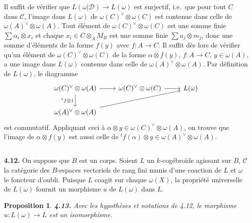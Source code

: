 \documentclass[12pt,a4paper]{article}
\theoremstyle{plain}
\newtheorem{proposition}[theorem]{Proposition}
\theoremstyle{definition}
\theoremstyle{remark}
\begin{document}
Il suffit de vérifier que $L(\omega|\mathcal{D}) \to L(\omega)$ est surjectif, i.e.~que pour tout $C$ dans $\mathcal{C}$, l'image dans $L(\omega)$ de $\omega(C)^\vee \otimes \omega(C)$ est contenue dans celle de $\omega(A)^\vee \otimes \omega(A)$. Tout élément de $\omega(C)^\vee \otimes \omega(C)$ est une somme finie $\sum \alpha_i \otimes x_i$ et chaque $x_i \in C \otimes_A M_B$ est une somme finie $\sum a_j \otimes m_j$, donc une somme d'éléments de la forme $f(y)$ avec $f : A \to C$. Il suffit dès lors de vérifier qu'un élément de $\omega(C)^\vee \otimes \omega(C)$ de la forme $\alpha \otimes f(y)$, $f : A \to C$, $y \in \omega(A)$, a une image dans $L(\omega)$ contenue dans celle de $\omega(A)^\vee \otimes \omega(A)$. Par définition de $L(\omega)$, le diagramme
\[
\begin{tikzcd}
\omega(C)^\vee \otimes \omega(A) \arrow[r] \arrow[d, "{}^t f \otimes 1"'] & \omega(C)^\vee \otimes \omega(C) \arrow[r] & L(\omega) \\
\omega(A)^\vee \otimes \omega(A) \arrow[rru]
\end{tikzcd}
\]
est commutatif. Appliquant ceci à $\alpha \otimes y \in \omega(C)^\vee \otimes \omega(A)$, on trouve que l'image de $\alpha \otimes f(y)$ est aussi celle de ${}^t f(\alpha) \otimes y \in \omega(A)^\vee \otimes \omega(A)$.

\subsection{}

\textbf{4.12.} On suppose que $B$ est un corps. Soient $L$ un $k$-cogébroïde agissant sur $B$, $\mathcal{C}$ la catégorie des $B$-espaces vectoriels de rang fini munis d'une coaction de $L$ et $\omega$ le foncteur d'oubli. Puisque $L$ coagit sur chaque $\omega(X)$, la propriété universelle de $L(\omega)$ fournit un morphisme $u$ de $L(\omega)$ dans $L$.

\begin{proposition}\label{prop:4.13}
\textbf{4.13.} Avec les hypothèses et notations de 4.12, le morphisme $u : L(\omega) \to L$ est un isomorphisme.
\end{proposition}
\end{document}
